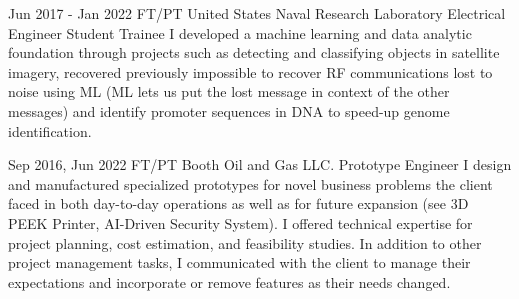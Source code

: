 \documentclass[
	10pt, %
]{FreemanCV}
\begin{document}
\begin{paracol}{2}

\jobentry
	{Jun 2017 - Jan 2022} %
	{FT/PT} %
	{United States Naval Research Laboratory} %
	{Electrical Engineer Student Trainee} %
	{ %
		I developed a machine learning and data analytic foundation through projects such as
		detecting and classifying objects in satellite imagery,
		recovered previously impossible to recover RF communications lost to noise using ML (ML lets us put the lost message in context of the other messages)
		and identify promoter sequences in DNA to speed-up genome identification.
	} 


\jobentry
	{Sep 2016, Jun 2022} %
	{FT/PT} %
	{Booth Oil and Gas LLC.} %
	{Prototype Engineer} %
	{ %
		I design and manufactured specialized prototypes for novel business problems the client faced in both day-to-day operations
		as well as for future expansion (see 3D PEEK Printer, AI-Driven Security System).
		I offered technical expertise for project planning, cost estimation, and feasibility studies.
		In addition to other project management tasks, I communicated with the client to manage their expectations
		and incorporate or remove features as their needs changed.
	}
	





	
	

\end{paracol}
\end{document}
